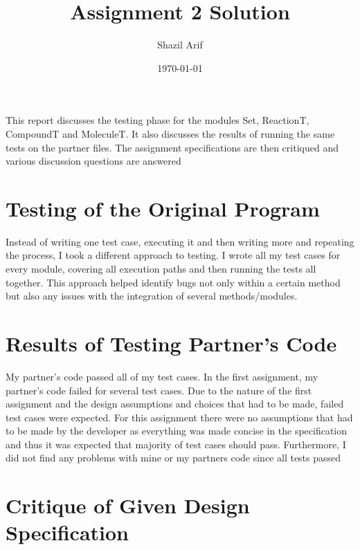 \documentclass[12pt]{article}
\title{Assignment 2 Solution}
\author{Shazil Arif}
\date{\today}
\begin{document}
\maketitle

This report discusses the testing phase for the modules Set, ReactionT, CompoundT and MoleculeT. It also discusses
the results of running the same tests on the partner files. The assignment specifications
are then critiqued and various discussion questions are answered

\section{Testing of the Original Program}


Instead of writing one test case, executing it and then writing more and repeating the process, I took a different approach to testing. I wrote all my test cases for every module, covering all execution paths and then running the tests all together. This approach helped identify bugs not only within a certain method but also any issues with the integration of several methods/modules.


\section{Results of Testing Partner's Code}

My partner's code passed all of my test cases. In the first assignment, my partner's code failed for several test cases. Due to the nature of the first assignment and the design assumptions and choices that had to be made, failed test cases were expected. For this assignment there were no assumptions that had to be made by the developer as everything was made concise in the specification and thus it was expected that majority of test cases should pass. Furthermore, I did not find any problems with mine or my partners code since all tests passed

\section{Critique of Given Design Specification}
\end{document}
